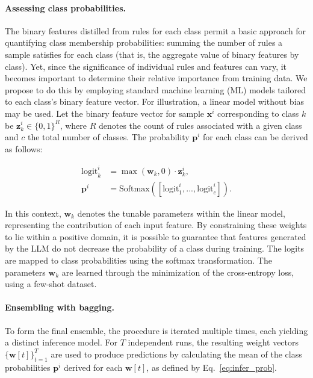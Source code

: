 \vspace*{-0.12in}
\paragraph{Assessing class probabilities.} The binary features distilled from rules for each class permit a basic approach for quantifying class membership probabilities: summing the number of rules a sample satisfies for each class (that is, the aggregate value of binary features by class). Yet, since the significance of individual rules and features can vary, it becomes important to determine their relative importance from training data. We propose to do this by employing standard machine learning (ML) models tailored to each class's binary feature vector. For illustration, a linear model without bias may be used. Let the binary feature vector for sample $\mathbf{x}^i$ corresponding to class $k$ be $\mathbf{z}_k^i \in \{0, 1\}^R$, where $R$ denotes the count of rules associated with a given class and $c$ the total number of classes. The probability $\mathbf{p}^i$ for each class can be derived as follows:

\begin{align}
\text{logit}_k^i &= \max(\mathbf{w}_k, 0) \cdot \mathbf{z}_k^i, \nonumber \\
\mathbf{p}^i &= \text{Softmax}({[\text{logit}_{1}^i, ..., \text{logit}_{c}^i]}). \label{eq:infer_prob}
\end{align}

In this context, $\mathbf{w}_k$ denotes the tunable parameters within the linear model, representing the contribution of each input feature. By constraining these weights to lie within a positive domain, it is possible to guarantee that features generated by the LLM do not decrease the probability of a class during training. The logits are mapped to class probabilities using the softmax transformation. The parameters $\mathbf{w}_k$ are learned through the minimization of the cross-entropy loss, using a few-shot dataset.

\vspace*{-0.12in}
\paragraph{Ensembling with bagging.} To form the final ensemble, the procedure is iterated multiple times, each yielding a distinct inference model. For $T$ independent runs, the resulting weight vectors $\{\mathbf{w}[t]\}_{t=1}^T$ are used to produce predictions by calculating the mean of the class probabilities $\mathbf{p}^i$ derived for each $\mathbf{w}[t]$, as defined by Eq.~\ref{eq:infer_prob}.

